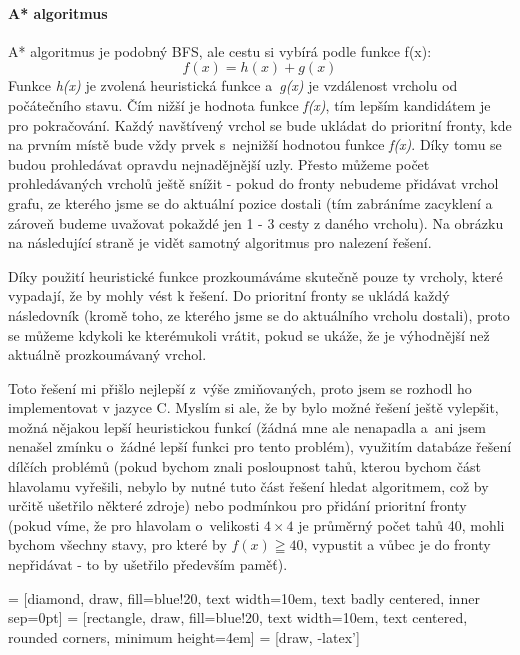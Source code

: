 \documentclass[12pt,titlepage]{article}
\begin{document}
\paragraph{A* algoritmus}
A* algoritmus je podobný BFS, ale cestu si vybírá podle funkce f(x):
$$f(x) = h(x) + g(x)$$
Funkce \textit{h(x)} je zvolená heuristická funkce a~\textit{g(x)} je vzdálenost vrcholu od počátečního stavu. Čím nižší je hodnota funkce \textit{f(x)}, tím lepším kandidátem je pro pokračování. Každý navštívený vrchol se bude ukládat do prioritní fronty, kde na prvním místě bude vždy prvek s~nejnižší hodnotou funkce \textit{f(x)}. Díky tomu se budou prohledávat opravdu nejnadějnější uzly. Přesto můžeme počet prohledávaných vrcholů ještě snížit - pokud do fronty nebudeme přidávat vrchol grafu, ze kterého jsme se do aktuální pozice dostali (tím zabráníme zacyklení a zároveň budeme uvažovat pokaždé jen 1 - 3 cesty z daného vrcholu). Na obrázku na následující straně je vidět samotný algoritmus pro nalezení řešení.
\par
Díky použití heuristické funkce prozkoumáváme skutečně pouze ty vrcholy, které vypadají, že by mohly vést k řešení. Do prioritní fronty se ukládá každý následovník (kromě toho, ze kterého jsme se do aktuálního vrcholu dostali), proto se můžeme kdykoli ke kterémukoli vrátit, pokud se ukáže, že je výhodnější než aktuálně prozkoumávaný vrchol.
\par
Toto řešení mi přišlo nejlepší z~výše zmiňovaných, proto jsem se rozhodl ho implementovat v jazyce C. Myslím si ale, že by bylo možné řešení ještě vylepšit, možná nějakou lepší heuristickou funkcí (žádná mne ale nenapadla a~ani jsem nenašel zmínku o~žádné lepší funkci pro tento problém), využitím databáze řešení dílčích problémů (pokud bychom znali posloupnost tahů, kterou bychom část hlavolamu vyřešili, nebylo by nutné tuto část řešení hledat algoritmem, což by určitě ušetřilo některé zdroje) nebo podmínkou pro přidání prioritní fronty (pokud víme, že pro hlavolam o~velikosti $4 \times 4$ je průměrný počet tahů 40, mohli bychom všechny stavy, pro které by $f(x) \geqq 40$, vypustit a vůbec je do fronty nepřidávat - to by ušetřilo především paměť).


 = [diamond, draw, fill=blue!20, 
    text width=10em, text badly centered, inner sep=0pt]
 = [rectangle, draw, fill=blue!20, 
    text width=10em, text centered, rounded corners, minimum height=4em]
 = [draw, -latex']
    
\end{document}
